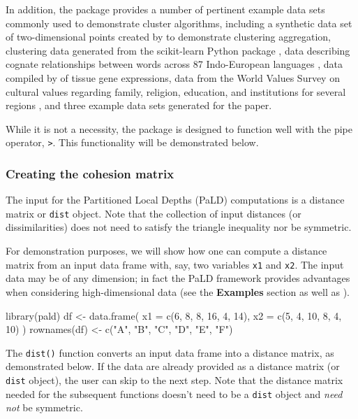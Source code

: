 In addition, the package provides a number of pertinent example data
sets commonly used to demonstrate cluster algorithms, including a
synthetic data set of two-dimensional points created by
\citet{gionis1clustering} to demonstrate clustering aggregation,
clustering data generated from the scikit-learn Python package
\citep{pedregosa2011scikit}, data describing cognate relationships
between words across 87 Indo-European languages \citep{dyen92}, data
compiled by \cite{tissue} of tissue gene expressions, data from the
World Values Survey \citep{inglehart2014world} on cultural values
regarding family, religion, education, and institutions for several
regions \citep{muthukrishna2020beyond}, and three example data sets
generated for the \citet{berenhaut2022social} paper.

While it is not a necessity, the  package is designed to
function well with the pipe operator, \texttt{\textbar{}\textgreater{}}.
This functionality will be demonstrated below.

\hypertarget{creating-the-cohesion-matrix}{%
\subsubsection{Creating the cohesion
matrix}\label{creating-the-cohesion-matrix}}

The input for the Partitioned Local Depths (PaLD) computations is a
distance matrix or \texttt{dist} object. Note that the collection of
input distances (or dissimilarities) does not need to satisfy the
triangle inequality nor be symmetric.

For demonstration purposes, we will show how one can compute a distance
matrix from an input data frame with, say, two variables \texttt{x1} and
\texttt{x2}. The input data may be of any dimension; in fact the PaLD
framework provides advantages when considering high-dimensional data
(see the \textbf{Examples} section as well as
\citet{berenhaut2022social}).

\begin{Schunk}
\begin{Sinput}
library(pald)
df <- data.frame(
  x1 = c(6, 8, 8, 16, 4, 14),
  x2 = c(5, 4, 10, 8, 4, 10)
)
rownames(df) <- c("A", "B", "C", "D", "E", "F")
\end{Sinput}
\end{Schunk}

The \texttt{dist()} function converts an input data frame into a
distance matrix, as demonstrated below. If the data are already provided
as a distance matrix (or \texttt{dist} object), the user can skip to the
next step. Note that the distance matrix needed for the subsequent
functions doesn't need to be a \texttt{dist} object and \emph{need not}
be symmetric.

